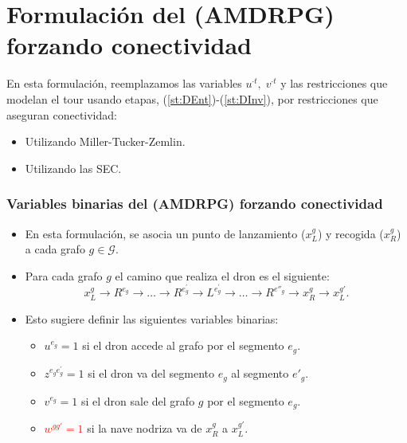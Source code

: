 \documentclass[slidestop,usepdftitle=false, xcolor=table]{beamer}
\begin{document}
		
\section{Formulación del (AMDRPG) forzando conectividad}
\begin{frame}
	En esta formulación, reemplazamos las variables $u^{\cdot t},\; v^{\cdot t}$ y las restricciones que modelan el tour usando etapas, (\ref{st:DEnt})-(\ref{st:DInv}), por restricciones que aseguran conectividad:
	\begin{itemize}
		\item Utilizando Miller-Tucker-Zemlin.
		\item Utilizando las SEC.
	\end{itemize}
\end{frame}

\begin{frame}
	\frametitle{Variables binarias del (AMDRPG) forzando conectividad}
	\begin{itemize}
	\item En esta formulación, se asocia un punto de lanzamiento ($x_L^g$) y recogida ($x_R^g$) a cada grafo $g\in\mathcal G$.
	\item Para cada grafo $g$ el camino que realiza el dron es el siguiente:
	 \begin{equation*}
	 x_L^g\rightarrow R^{e_g}\rightarrow\ldots\rightarrow R^{e^\prime_g}\rightarrow L^{e^\prime_g}\rightarrow \ldots \rightarrow R^{e''_g} \rightarrow x_R^g\rightarrow x_L^{g'}.
	 \end{equation*}
	 \item Esto sugiere definir las siguientes variables binarias:
\begin{itemize}
    \item $u^{e_g} = 1$ si el dron accede al grafo por el segmento $e_g$.
    \item $z^{e_ge^\prime_g} = 1$ si el dron va del segmento $e_g$ al segmento $e'_g$.
    \item $v^{e_g} = 1$ si el dron sale del grafo $g$ por el segmento $e_g$.
    \item \textcolor{red}{$w^{gg'} = 1$} si la nave nodriza va de $x_R^g$ a $x_L^{g'}$.
\end{itemize}
	\end{itemize}
	\end{frame}
\end{document}
